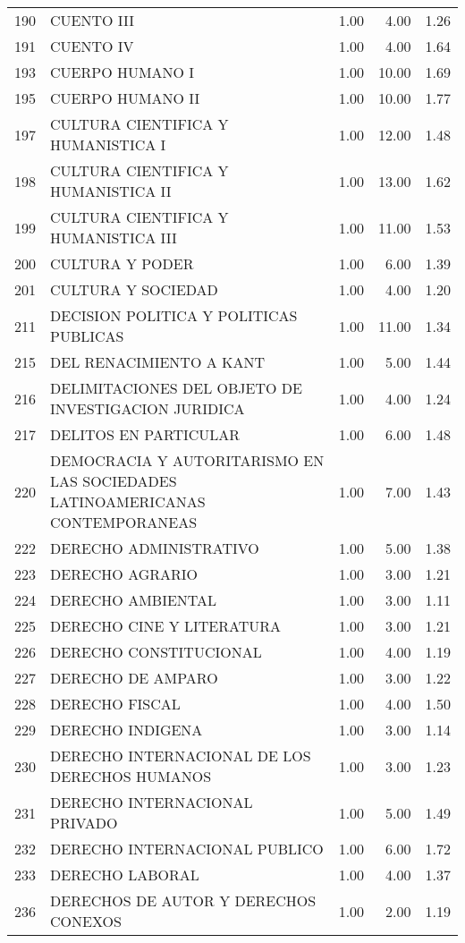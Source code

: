 \documentclass[12pt]{article}
\begin{document}
\begin{table}[ht]
\begin{tabular}{rlrrr}
  190 & CUENTO III & 1.00 & 4.00 & 1.26 \\ 
  191 & CUENTO IV & 1.00 & 4.00 & 1.64 \\ 
  193 & CUERPO HUMANO I & 1.00 & 10.00 & 1.69 \\ 
  195 & CUERPO HUMANO II & 1.00 & 10.00 & 1.77 \\ 
  197 & CULTURA CIENTIFICA Y HUMANISTICA I & 1.00 & 12.00 & 1.48 \\ 
  198 & CULTURA CIENTIFICA Y HUMANISTICA II & 1.00 & 13.00 & 1.62 \\ 
  199 & CULTURA CIENTIFICA Y HUMANISTICA III & 1.00 & 11.00 & 1.53 \\ 
  200 & CULTURA Y PODER & 1.00 & 6.00 & 1.39 \\ 
  201 & CULTURA Y SOCIEDAD & 1.00 & 4.00 & 1.20 \\ 
  211 & DECISION POLITICA Y POLITICAS PUBLICAS & 1.00 & 11.00 & 1.34 \\ 
  215 & DEL RENACIMIENTO A KANT & 1.00 & 5.00 & 1.44 \\ 
  216 & DELIMITACIONES DEL OBJETO DE INVESTIGACION JURIDICA & 1.00 & 4.00 & 1.24 \\ 
  217 & DELITOS EN PARTICULAR & 1.00 & 6.00 & 1.48 \\ 
  220 & DEMOCRACIA Y AUTORITARISMO EN LAS SOCIEDADES LATINOAMERICANAS CONTEMPORANEAS & 1.00 & 7.00 & 1.43 \\ 
  222 & DERECHO ADMINISTRATIVO & 1.00 & 5.00 & 1.38 \\ 
  223 & DERECHO AGRARIO & 1.00 & 3.00 & 1.21 \\ 
  224 & DERECHO AMBIENTAL & 1.00 & 3.00 & 1.11 \\ 
  225 & DERECHO CINE Y LITERATURA & 1.00 & 3.00 & 1.21 \\ 
  226 & DERECHO CONSTITUCIONAL & 1.00 & 4.00 & 1.19 \\ 
  227 & DERECHO DE AMPARO & 1.00 & 3.00 & 1.22 \\ 
  228 & DERECHO FISCAL & 1.00 & 4.00 & 1.50 \\ 
  229 & DERECHO INDIGENA & 1.00 & 3.00 & 1.14 \\ 
  230 & DERECHO INTERNACIONAL DE LOS DERECHOS HUMANOS & 1.00 & 3.00 & 1.23 \\ 
  231 & DERECHO INTERNACIONAL PRIVADO & 1.00 & 5.00 & 1.49 \\ 
  232 & DERECHO INTERNACIONAL PUBLICO & 1.00 & 6.00 & 1.72 \\ 
  233 & DERECHO LABORAL & 1.00 & 4.00 & 1.37 \\ 
  236 & DERECHOS DE AUTOR Y DERECHOS CONEXOS & 1.00 & 2.00 & 1.19 \\ 

\end{tabular}
\end{table}
\end{document}
